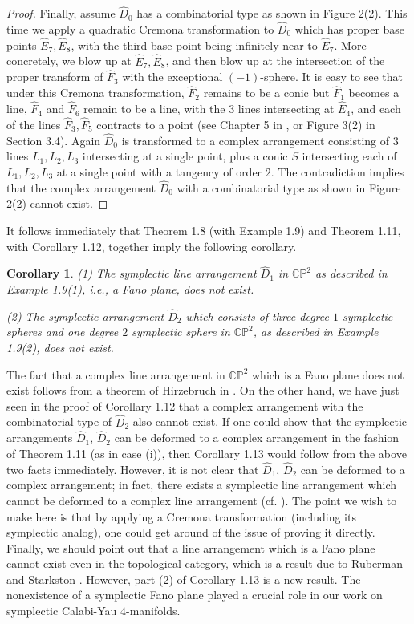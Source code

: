 \documentclass[11pt]{amsart}
\theoremstyle{plain}
\numberwithin{theorem}{section}
\newtheorem{corollary}[theorem]{Corollary}
\theoremstyle{definition}
\newcommand{\C}{{\mathbb C}}
\renewcommand{\P}{{\mathbb P}}
\begin{document}
\begin{proof}
Finally, assume $\hat{D}_0$ has a combinatorial type as shown in Figure 2(2). This time we apply a quadratic 
Cremona transformation to $\hat{D}_0$ which has proper base points $\hat{E}_7,\hat{E}_8$, with the third base point being infinitely near to $\hat{E}_7$. More concretely, we blow up at $\hat{E}_7,\hat{E}_8$, and then blow up at the intersection of the proper transform of $\hat{F}_3$ with the exceptional $(-1)$-sphere. It is easy to see that under this Cremona transformation, $\hat{F}_2$ remains to be a conic but $\hat{F}_1$ becomes a line, 
$\hat{F}_4$ and $\hat{F}_6$ remain to be a line, with the $3$ lines intersecting at $\hat{E}_4$, and each of the lines $\hat{F}_3,\hat{F}_5$ contracts to a point (see Chapter 5 in \cite{Moe}, or Figure 3(2) in Section 3.4). Again 
$\hat{D}_0$ is transformed to a complex arrangement consisting of $3$ lines $L_1,L_2,L_3$ intersecting 
at a single point, plus a conic $S$ intersecting each of $L_1,L_2,L_3$ at a single point with a tangency of 
order $2$. The contradiction implies that the complex arrangement $\hat{D}_0$ with a combinatorial type as shown in Figure 2(2) cannot exist. 

\end{proof}


It follows immediately that Theorem 1.8 (with Example 1.9) and Theorem 1.11, with Corollary 1.12, 
together imply the following corollary. 

\begin{corollary}
{\em(1)} The symplectic line arrangement $\hat{D}_1$ in $\C\P^2$ as described in Example 1.9(1), i.e., a Fano plane, does not exist. 

{\em(2)} The symplectic arrangement $\hat{D}_2$ which consists of three degree $1$ symplectic spheres and one
degree $2$ symplectic sphere in $\C\P^2$, as described in Example 1.9(2), does not exist. 
\end{corollary}

The fact that a complex line arrangement in $\C\P^2$ which is a Fano plane does not exist follows from a theorem of Hirzebruch in \cite{H}. On the other hand, we have just seen in the proof of Corollary 1.12 that a complex arrangement with the combinatorial type of $\hat{D}_2$ also cannot exist. If one could show that the symplectic arrangements $\hat{D}_1$, $\hat{D}_2$ can be deformed to a complex arrangement in the fashion of Theorem 1.11 (as in case (i)), then Corollary 1.13 would follow from the above two facts immediately. However, it is not clear that 
$\hat{D}_1$, $\hat{D}_2$ can be deformed to a complex arrangement; in fact, there exists a symplectic line arrangement which cannot be deformed to a complex line arrangement (cf. \cite{RuS}). The point we wish to make here is that by applying a Cremona transformation (including its symplectic analog), one could get around of the issue of proving it directly. Finally, we should point out that a line arrangement which is a Fano plane cannot exist even in the topological category, which is a result due to Ruberman and Starkston \cite{RuS}. However, part (2) of
Corollary 1.13 is a new result. The nonexistence of a symplectic Fano plane played a crucial role in 
our work \cite{C} on symplectic Calabi-Yau $4$-manifolds. 
\end{document}
